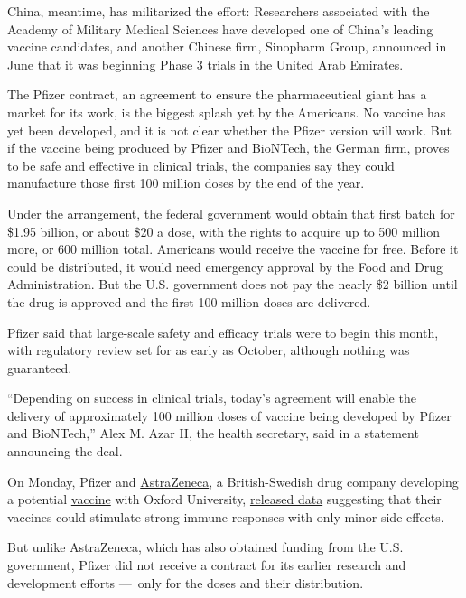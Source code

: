 China, meantime, has militarized the effort: Researchers associated with
the Academy of Military Medical Sciences have developed one of China's
leading vaccine candidates, and another Chinese firm, Sinopharm Group,
announced in June that it was beginning Phase 3 trials in the United
Arab Emirates.

The Pfizer contract, an agreement to ensure the pharmaceutical giant has
a market for its work, is the biggest splash yet by the Americans. No
vaccine has yet been developed, and it is not clear whether the Pfizer
version will work. But if the vaccine being produced by Pfizer and
BioNTech, the German firm, proves to be safe and effective in clinical
trials, the companies say they could manufacture those first 100 million
doses by the end of the year.

Under
\href{https://www.businesswire.com/news/home/20200722005438/en/Pfizer-BioNTech-Announce-Agreement-U.S.-Government-600}{the
arrangement}, the federal government would obtain that first batch for
\$1.95 billion, or about \$20 a dose, with the rights to acquire up to
500 million more, or 600 million total. Americans would receive the
vaccine for free. Before it could be distributed, it would need
emergency approval by the Food and Drug Administration. But the U.S.
government does not pay the nearly \$2 billion until the drug is
approved and the first 100 million doses are delivered.

Pfizer said that large-scale safety and efficacy trials were to begin
this month, with regulatory review set for as early as October, although
nothing was guaranteed.

``Depending on success in clinical trials, today's agreement will enable
the delivery of approximately 100 million doses of vaccine being
developed by Pfizer and BioNTech,'' Alex M. Azar II, the health
secretary, said in a statement announcing the deal.

On Monday, Pfizer and
\href{https://www.nytimes3xbfgragh.onion/2020/05/21/health/coronavirus-vaccine-astrazeneca.html}{AstraZeneca},
a British-Swedish drug company developing a potential
\href{https://www.nytimes3xbfgragh.onion/interactive/2020/06/09/magazine/covid-vaccine.html}{vaccine}
with Oxford University,
\href{https://www.nytimes3xbfgragh.onion/2020/07/20/world/covid-coronavirus-vaccine.html}{released
data} suggesting that their vaccines could stimulate strong immune
responses with only minor side effects.

But unlike AstraZeneca, which has also obtained funding from the U.S.
government, Pfizer did not receive a contract for its earlier research
and development efforts ---~only for the doses and their distribution.

